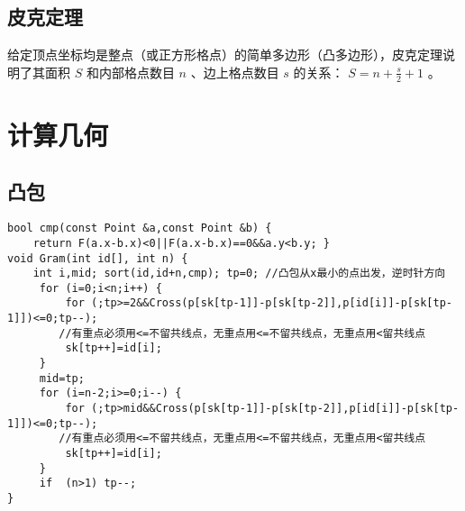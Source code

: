 \documentclass{article}
\begin{document}
\subsection{皮克定理}

给定顶点坐标均是整点（或正方形格点）的简单多边形（凸多边形），皮克定理说明了其面积 $S$ 和内部格点数目 $n$ 、边上格点数目 $s$ 的关系： $S = n + \frac{s}{2} + 1$ 。


\section{计算几何}

\subsection{凸包}
\begin{lstlisting}
bool cmp(const Point &a,const Point &b) {
	return F(a.x-b.x)<0||F(a.x-b.x)==0&&a.y<b.y; }
void Gram(int id[], int n) {
	int i,mid; sort(id,id+n,cmp); tp=0; //凸包从x最小的点出发，逆时针方向
     for (i=0;i<n;i++) {
         for (;tp>=2&&Cross(p[sk[tp-1]]-p[sk[tp-2]],p[id[i]]-p[sk[tp-1]])<=0;tp--); 
		//有重点必须用<=不留共线点，无重点用<=不留共线点，无重点用<留共线点
         sk[tp++]=id[i];
     }
     mid=tp;
     for (i=n-2;i>=0;i--) {
         for (;tp>mid&&Cross(p[sk[tp-1]]-p[sk[tp-2]],p[id[i]]-p[sk[tp-1]])<=0;tp--); 
		//有重点必须用<=不留共线点，无重点用<=不留共线点，无重点用<留共线点
         sk[tp++]=id[i];
     }
     if  (n>1) tp--;
}
\end{lstlisting}
\end{document}
